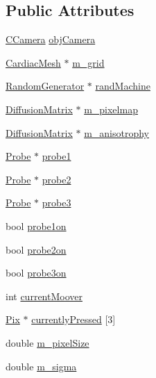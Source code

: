 \subsection*{Public Attributes}
\begin{DoxyCompactItemize}
\item 
\hyperlink{class_c_camera}{C\+Camera} \hyperlink{class_diffusion_painter_a1e66d5dd4118326a1e1a7bb45efac9f0}{obj\+Camera}
\item 
\hyperlink{class_cardiac_mesh}{Cardiac\+Mesh} $\ast$ \hyperlink{class_diffusion_painter_ad405e9e83988d4e31abc060c7fa53f58}{m\+\_\+grid}
\item 
\hyperlink{class_random_generator}{Random\+Generator} $\ast$ \hyperlink{class_diffusion_painter_a899e223882748c213c482f298ed2cc6a}{rand\+Machine}
\item 
\hyperlink{class_diffusion_matrix}{Diffusion\+Matrix} $\ast$ \hyperlink{class_diffusion_painter_a6a402014322aadca9e82bcf419d9b0c7}{m\+\_\+pixelmap}
\item 
\hyperlink{class_diffusion_matrix}{Diffusion\+Matrix} $\ast$ \hyperlink{class_diffusion_painter_a41a28924c03b3be5a3f7e4bee530345b}{m\+\_\+anisotrophy}
\item 
\hyperlink{class_probe}{Probe} $\ast$ \hyperlink{class_diffusion_painter_aaad25aaf3a5a9bd133a903f4e5afa109}{probe1}
\item 
\hyperlink{class_probe}{Probe} $\ast$ \hyperlink{class_diffusion_painter_a7e1f6b5119f36b87b2f6a6de6df14865}{probe2}
\item 
\hyperlink{class_probe}{Probe} $\ast$ \hyperlink{class_diffusion_painter_a977dd52f37fe18bac0c3c3f33e5aafa4}{probe3}
\item 
bool \hyperlink{class_diffusion_painter_a296bff01cbabce25cdf1f57a3b65b98c}{probe1on}
\item 
bool \hyperlink{class_diffusion_painter_a7a436a62915aff0201b9b5e742ca9a62}{probe2on}
\item 
bool \hyperlink{class_diffusion_painter_ad923bf9dfbf4a10b8231037cf3070831}{probe3on}
\item 
int \hyperlink{class_diffusion_painter_a9ea99ac669bf6661a46ea41dbabc7521}{current\+Moover}
\item 
\hyperlink{class_pix}{Pix} $\ast$ \hyperlink{class_diffusion_painter_aa57b223dd919193fe1ac1b38ddeee4a4}{currently\+Pressed} \mbox{[}3\mbox{]}
\item 
double \hyperlink{class_diffusion_painter_a7884d552b7170c5e9573aa661c16ca44}{m\+\_\+pixel\+Size}
\item 
double \hyperlink{class_diffusion_painter_a09984e636cac8045cb45271593a042c4}{m\+\_\+sigma}

\end{DoxyCompactItemize}
